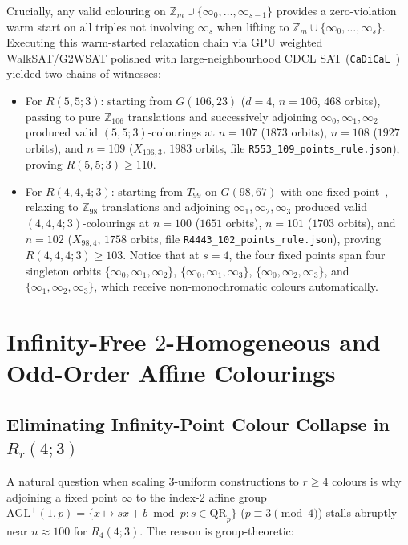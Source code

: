 \documentclass[11pt]{article}
\theoremstyle{remark}
\newcommand{\Z}{\mathbb{Z}}
\begin{document}
Crucially, any valid colouring on $\Z_m\cup\{\infty_0,\dots,\infty_{s-1}\}$
provides a zero-violation warm start on all triples not involving $\infty_s$
when lifting to $\Z_m\cup\{\infty_0,\dots,\infty_s\}$. Executing this
warm-started relaxation chain via GPU weighted WalkSAT/G2WSAT polished with
large-neighbourhood CDCL SAT (\texttt{CaDiCaL}~\cite{cadical,pysat}) yielded two
chains of witnesses:
\begin{itemize}
\item For $R(5,5;3)$: starting from $G(106,23)$ ($d=4$, $n=106$, $468$ orbits),
  passing to pure $\Z_{106}$ translations and successively adjoining
  $\infty_0,\infty_1,\infty_2$ produced valid $(5,5;3)$-colourings at
  $n=107$ ($1873$ orbits), $n=108$ ($1927$ orbits), and $n=109$
  ($X_{106,3}$, $1983$ orbits, file \texttt{R553\_109\_points\_rule.json}),
  proving $R(5,5;3)\ge 110$.
\item For $R(4,4,4;3)$: starting from $T_{99}$ on $G(98,67)$ with one fixed
  point~\cite{hashimoto1}, relaxing to $\Z_{98}$ translations and adjoining
  $\infty_1,\infty_2,\infty_3$ produced valid $(4,4,4;3)$-colourings at
  $n=100$ ($1651$ orbits), $n=101$ ($1703$ orbits), and $n=102$
  ($X_{98,4}$, $1758$ orbits, file \texttt{R4443\_102\_points\_rule.json}),
  proving $R(4,4,4;3)\ge 103$. Notice that at $s=4$, the four fixed points span
  four singleton orbits $\{\infty_0,\infty_1,\infty_2\}$,
  $\{\infty_0,\infty_1,\infty_3\}$, $\{\infty_0,\infty_2,\infty_3\}$, and
  $\{\infty_1,\infty_2,\infty_3\}$, which receive non-monochromatic colours
  automatically.
\end{itemize}

\section{Infinity-Free \texorpdfstring{$2$}{2}-Homogeneous and Odd-Order Affine Colourings}\label{sec:affine}

\subsection{Eliminating Infinity-Point Colour Collapse in \texorpdfstring{$R_r(4;3)$}{R\_r(4;3)}}

A natural question when scaling $3$-uniform constructions to $r\ge 4$ colours is
why adjoining a fixed point $\infty$ to the index-$2$ affine group
$\mathrm{AGL}^+(1,p)=\{x\mapsto sx+b\bmod p : s\in\mathrm{QR}_p\}$ ($p\equiv 3\pmod 4$)
stalls abruptly near $n\approx 100$ for $R_4(4;3)$. The reason is group-theoretic:
\end{document}
